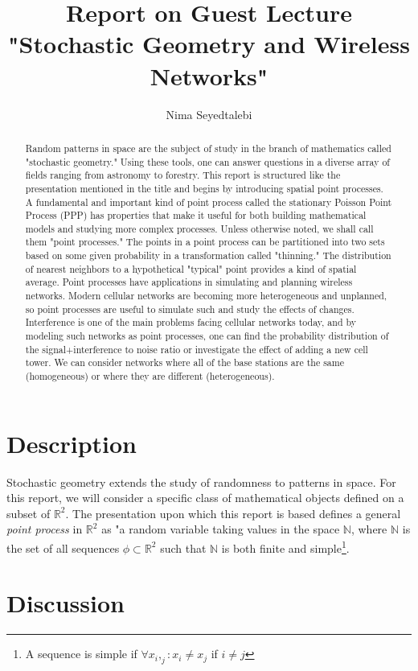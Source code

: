 \documentclass[]{article}
\title{Report on Guest Lecture "Stochastic Geometry and Wireless Networks"}
\author{Nima Seyedtalebi}
\begin{document}
\maketitle

\begin{abstract}
Random patterns in space are the subject of study in the branch of mathematics called "stochastic geometry." Using these tools, one can answer questions in a diverse array of fields ranging from astronomy to forestry. This report is structured like the presentation mentioned in the title and begins by introducing spatial point processes. A fundamental and important kind of point process called the stationary Poisson Point Process (PPP) has properties that make it useful for both building mathematical models and studying more complex processes. Unless otherwise noted, we shall call them "point processes." The points in a point process can be partitioned into two sets based on some given probability in a transformation called "thinning." The distribution of nearest neighbors to a hypothetical "typical" point provides a kind of spatial average.
Point processes have applications in simulating and planning wireless networks. Modern cellular networks are becoming more heterogeneous and unplanned, so point processes are useful to simulate such and study the effects of changes. Interference is one of the main problems facing cellular networks today, and by modeling such networks as point processes, one can find the probability distribution of the signal+interference to noise ratio or investigate the effect of adding a new cell tower. We can consider networks where all of the base stations are the same (homogeneous) or where they are different (heterogeneous).
\end{abstract}

\section{Description}
Stochastic geometry extends the study of randomness to patterns in space. For this report, we will consider a specific class of mathematical objects defined on a subset of $\mathbb{R}^2$.  The presentation upon which this report is based defines a general \textit{point process} in $\mathbb{R}^2$ as "a random variable taking values in the space $\mathbb{N}$, where $\mathbb{N}$ is the set of all sequences $\phi \subset \mathbb{R}^2$ such that $\mathbb{N}$ is both finite and simple\footnote{A sequence is simple if $\forall x_i,_j: x_i \neq x_j$ if $i \neq j$}.
\section{Discussion}
\end{document}

